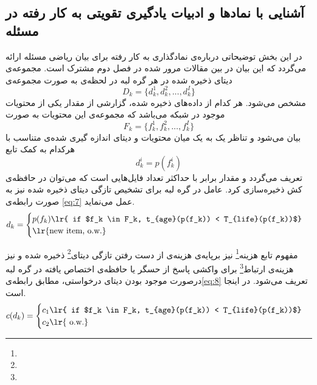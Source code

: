 \newpage
\subsection{آشنایی با نمادها و ادبیات یادگیری تقویتی به کار رفته در مسئله}
در این بخش توضیحاتی درباره‌ی نمادگذاری به کار رفته برای بیان ریاضی مسئله ارائه می‌گردد که این بیان در بین مقالات مرور شده در فصل دوم مشترک است.  مجموعه‌ی دیتای ذخیره شده در هر گره لبه در لحظه‌ی  به صورت مجموعه‌ی 
\begin{equation}\label{eq4}
	D_k = \{d_k^1, d_k^2, ..., d_k^I\}
\end{equation}
 مشخص می‌شود. هر کدام از داده‌های ذخیره شده، گزارشی از مقدار یکی از محتویات موجود در شبکه می‌باشد که مجموعه‌ی این محتویات به صورت 
\begin{equation}\label{eq5}
	F_k = \{f_k^1, f_k^2, ..., f_k^I\}
\end{equation}
بیان می‌شود و تناظر یک به یک میان محتویات و دیتای اندازه گیری شده‌ی متناسب با هرکدام به کمک تابع 
\begin{equation}\label{eq6}
	d_k^i = p(f_k^i)
\end{equation}
 تعریف می‌گردد و مقدار  برابر با حداکثر تعداد فایل‌هایی است که می‌توان در حافظه‌ی کش ذخیره‌سازی کرد. عامل در گره لبه برای تشخیص تازگی دیتای ذخیره شده نیز به صورت رابطه‌ی \ref{eq:7} عمل می‌نماید.
 \begin{equation}\label{eq:7}
 	d_k = \begin{cases}
 		p(f_k) \text{\lr{ if $f_k \in F_k, t_{age}(p(f_k)) < T_{life}(p(f_k))$}}\\
 		\text{\lr{new item, o.w.}}
 	\end{cases}
 \end{equation}

مفهوم تابع هزینه\footnote{} نیز برپایه‌ی هزینه‌ی از دست رفتن تازگی دیتای\footnote{} ذخیره شده و نیز هزینه‌ی ارتباط\footnote{} برای واکشی پاسخ از حسگر یا حافظه‌ی اختصاص یافته در گره لبه درصورت موجود بودن دیتای درخواستی، مطابق رابطه‌ی\ref{eq:8} تعریف می‌شود. در اینجا  است.
\begin{equation}\label{eq:8}
	c(d_k) = \begin{cases}
		c_1 \text{\lr{ if $f_k \in F_k, t_{age}(p(f_k)) < T_{life}(p(f_k))$}}\\
		c_2 \text{\lr{ o.w.}}
	\end{cases}
\end{equation}  
 
